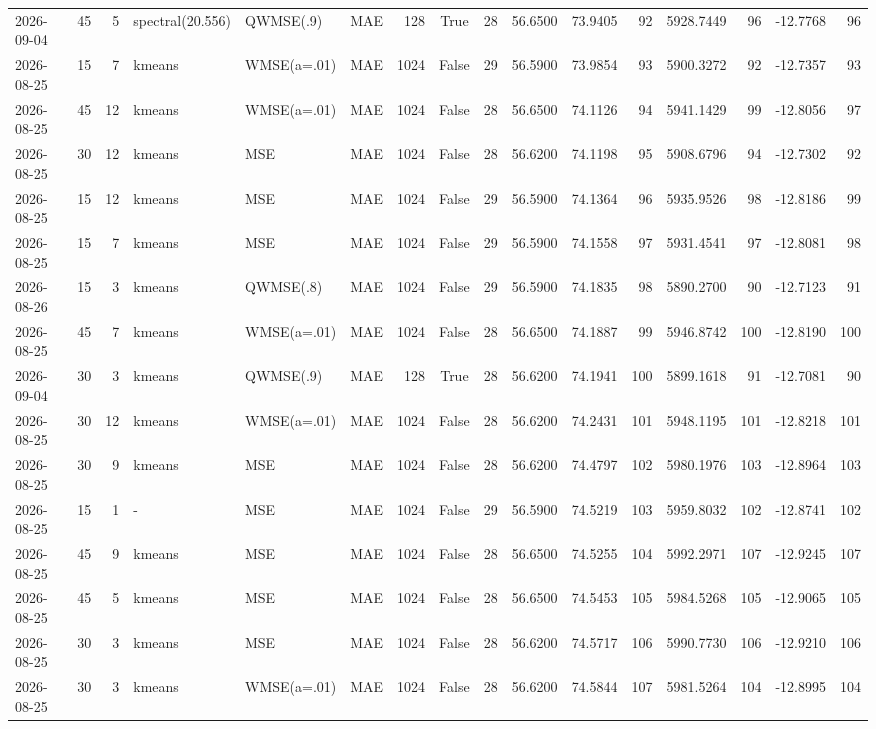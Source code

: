 \documentclass[10pt]{article}
\begin{document}
\begin{landscape}
\begin{longtable}{@{}lrrlllrcrrrrrrrr@{}}
2026-09-04 & 45 & 5 & spectral(20.556) & QWMSE(.9) & MAE & 128 & True & 28 & 56.6500 & 73.9405 & 92 & 5928.7449 & 96 & -12.7768 & 96 \\
2026-08-25 & 15 & 7 & kmeans & WMSE(a=.01) & MAE & 1024 & False & 29 & 56.5900 & 73.9854 & 93 & 5900.3272 & 92 & -12.7357 & 93 \\
2026-08-25 & 45 & 12 & kmeans & WMSE(a=.01) & MAE & 1024 & False & 28 & 56.6500 & 74.1126 & 94 & 5941.1429 & 99 & -12.8056 & 97 \\
2026-08-25 & 30 & 12 & kmeans & MSE & MAE & 1024 & False & 28 & 56.6200 & 74.1198 & 95 & 5908.6796 & 94 & -12.7302 & 92 \\
2026-08-25 & 15 & 12 & kmeans & MSE & MAE & 1024 & False & 29 & 56.5900 & 74.1364 & 96 & 5935.9526 & 98 & -12.8186 & 99 \\
2026-08-25 & 15 & 7 & kmeans & MSE & MAE & 1024 & False & 29 & 56.5900 & 74.1558 & 97 & 5931.4541 & 97 & -12.8081 & 98 \\
2026-08-26 & 15 & 3 & kmeans & QWMSE(.8) & MAE & 1024 & False & 29 & 56.5900 & 74.1835 & 98 & 5890.2700 & 90 & -12.7123 & 91 \\
2026-08-25 & 45 & 7 & kmeans & WMSE(a=.01) & MAE & 1024 & False & 28 & 56.6500 & 74.1887 & 99 & 5946.8742 & 100 & -12.8190 & 100 \\
2026-09-04 & 30 & 3 & kmeans & QWMSE(.9) & MAE & 128 & True & 28 & 56.6200 & 74.1941 & 100 & 5899.1618 & 91 & -12.7081 & 90 \\
2026-08-25 & 30 & 12 & kmeans & WMSE(a=.01) & MAE & 1024 & False & 28 & 56.6200 & 74.2431 & 101 & 5948.1195 & 101 & -12.8218 & 101 \\
2026-08-25 & 30 & 9 & kmeans & MSE & MAE & 1024 & False & 28 & 56.6200 & 74.4797 & 102 & 5980.1976 & 103 & -12.8964 & 103 \\
2026-08-25 & 15 & 1 & - & MSE & MAE & 1024 & False & 29 & 56.5900 & 74.5219 & 103 & 5959.8032 & 102 & -12.8741 & 102 \\
2026-08-25 & 45 & 9 & kmeans & MSE & MAE & 1024 & False & 28 & 56.6500 & 74.5255 & 104 & 5992.2971 & 107 & -12.9245 & 107 \\
2026-08-25 & 45 & 5 & kmeans & MSE & MAE & 1024 & False & 28 & 56.6500 & 74.5453 & 105 & 5984.5268 & 105 & -12.9065 & 105 \\
2026-08-25 & 30 & 3 & kmeans & MSE & MAE & 1024 & False & 28 & 56.6200 & 74.5717 & 106 & 5990.7730 & 106 & -12.9210 & 106 \\
2026-08-25 & 30 & 3 & kmeans & WMSE(a=.01) & MAE & 1024 & False & 28 & 56.6200 & 74.5844 & 107 & 5981.5264 & 104 & -12.8995 & 104 \\

\end{longtable}
\end{landscape}
\end{document}
